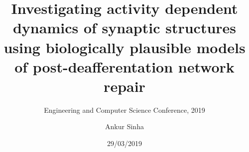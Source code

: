 
\usepackage{color}
\usepackage{tipa}
\usepackage[scale=2]{ccicons}
\usepackage{amssymb}
\usepackage{tikz}
\usetikzlibrary{arrows.meta, arrows}
\usepackage{pgfplots}
\usepackage{jneurosci}
\usepackage{subfig}
\usepackage[T1]{fontenc}
\usepackage[utf8]{inputenc}
\usepackage[style=nature,backend=biber,autocite=footnote]{biblatex}

\usepackage[default,osfigures,scale=0.95]{opensans}
\usepackage[normalem]{ulem}
\usepackage{hyperref}
\hypersetup{colorlinks,linkcolor=Green,urlcolor=links}
\usepackage{graphicx}
\usepackage{algorithmic}
\usepackage{textcomp}
\usepackage{wrapfig}
\usepackage{textgreek}
\usepackage{euler}



\title{Investigating activity dependent dynamics of synaptic structures using biologically plausible models of post-deafferentation network repair}
\subtitle{Engineering and Computer Science Conference, 2019}
\author[Ankur Sinha]{Ankur Sinha}
\date{29/03/2019}



\begin{frame}
  \titlepage{}
\end{frame}

